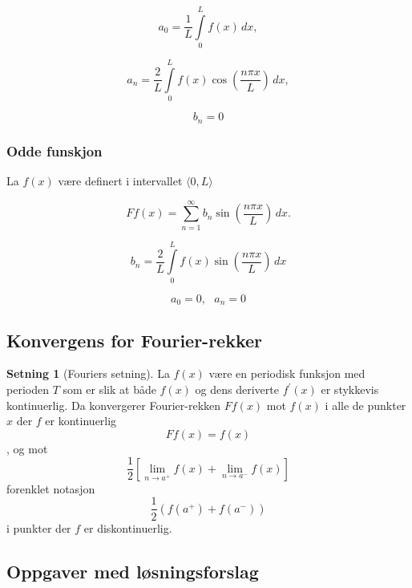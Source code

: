 \documentclass[11pt]{article}
\theoremstyle{definition}
\theoremstyle{definition}
\theoremstyle{definition}
\newtheorem{minset}{Setning}[section]
\newenvironment{fminset}
{\begin{mdframed}[style=minstil]\begin{minset}}
		{\end{minset}\end{mdframed}}
\theoremstyle{definition}
\theoremstyle{definition}
\theoremstyle{definition}
\begin{document}
		\[a_0=\dfrac{1}{L}\int\limits_{0}^{L} f(x) \, dx, \]
		
		\[a_n=\dfrac{2}{L}\int\limits_{0}^{L} f(x)\cos \left( \frac{n\pi x}{L} \right) \,dx, \]
		
		\[b_n=0\]
		
		\subsubsection{Odde funskjon}
		
		La \(f(x)\) være definert i intervallet \(\langle 0,L \rangle\)
		
		\[Ff(x)=\sum_{n=1}^{\infty}b_n \sin \left( \dfrac{n\pi x}{L} \right)\, dx.  \]
		
		\[b_n=\dfrac{2}{L}\int\limits_{0}^{L}f(x)\sin \left( \dfrac{n\pi x}{L} \right) \, dx \]
		
		\[a_0=0,\,\,\,\,a_n=0\]
		
		\newpage
		
		\subsection{Konvergens for Fourier-rekker}
		
		\begin{fminset}[Fouriers setning]
			
			La \(f(x)\) være en periodisk funksjon med perioden \(T\) som er slik at både \(f(x)\) og dens deriverte \(f^{\prime}(x)\) er stykkevis kontinuerlig. Da konvergerer Fourier-rekken \(Ff(x)\) mot \(f(x)\) i alle de punkter \(x\) der \(f\) er kontinuerlig \[Ff(x)=f(x)\] 
			, og mot
			\[\frac{1}{2}\left[ \lim\limits_{n\rightarrow a^{+}}f(x) + \lim\limits_{n\rightarrow a^{-}}f(x) \right] \]
			forenklet notasjon
			\[\frac{1}{2}\left( f(a^+)+f(a^-) \right) \]
			i punkter der \(f\) er diskontinuerlig.
		\end{fminset}
		\newpage
		
		\subsection{Oppgaver med løsningsforslag}
		
\end{document}

